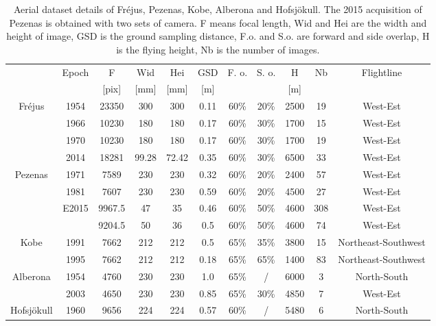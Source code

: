 \begin{table}[htbp]
	\scriptsize %
	\centering
	\begin{tabular}{||c|c||c|c|c|c|c|c|c|c|c||}\hline
& \multirow{2}{*}{Epoch} & F & Wid & Hei & GSD & \multirow{2}{*}{F. o.} & \multirow{2}{*}{S. o.} & H & \multirow{2}{*}{Nb} & \multirow{2}{*}{Flightline} \\
&  & [pix] & [mm] & [mm] & [m] & & & [m] & & \\\hline\hline

\multirow{4}{*}{Fr{\'e}jus} & 1954 & 23350 & 300 & 300 & \color{black}0.11 & 60\% & 20\% & 2500 & 19 & West-Est \\
& 1966 & 10230 & 180 & 180 & \color{black}0.17 & 60\% & 30\% & 1700 & 15& West-Est \\
& 1970 & 10230 & 180 & 180 & 0.17 & 60\% & 30\% & 1700 & 19& West-Est \\
& 2014 & \color{black}18281 & 99.28 & 72.42 & 0.35 & 60\% & 30\% & 6500 & 33& West-Est \\\hline\hline

\multirow{4}{*}{Pezenas} & 1971 & 7589 & 230 & 230 & 0.32 &    60\% &    20\% & 2400 & 57& West-Est \\
& 1981 & 7607 & 230 & 230 & 0.59 & 60\% & 20\% & 4500 & 27& West-Est \\
& \multirow{2}{*}{E2015} & 9967.5 & 47 & 35 & 0.46 & 60\% & 50\% & 4600 & 308& West-Est \\
&  & 9204.5 & 50 & 36 & 0.5 & 60\% & 50\% & 4600 & 74& West-Est \\\hline\hline

\multirow{2}{*}{Kobe}& 1991& 7662 & 212 & 212 & 0.5 &    65\% &    35\% & 3800 & 15 & Northeast-Southwest \\
& 1995& 7662 & 212 & 212 & 0.18 & 65\% & 65\% & 1400 & 83& Northeast-Southwest \\\hline\hline

\multirow{2}{*}{Alberona}& 1954 & 4760 & 230 & 230 & 1.0 & 65\% & / & 6000 & 3& North-South \\
& 2003 & 4650 & 230 & 230 & 0.85 & 65\% & 30\% & 4850 & 7 & West-Est \\\hline\hline

Hofsjökull & 1960 & 9656 & 224 & 224 & 0.57 & 60\% & / & 5480 & 6 & North-South \\\hline
	\end{tabular}
	\caption{Aerial dataset details of Fr{\'e}jus, Pezenas, Kobe, Alberona and Hofsjökull. The 2015 acquisition of Pezenas is obtained with two sets of camera. F means focal length, Wid and Hei are the width and height of image, GSD is the ground sampling distance, F.o. and S.o. are forward and side overlap, H is the flying height, Nb is the number of images.}
	\label{AerialData}
\end{table}

